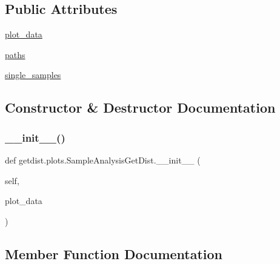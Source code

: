 \subsection*{Public Attributes}
\begin{DoxyCompactItemize}
\item 
\mbox{\hyperlink{classgetdist_1_1plots_1_1SampleAnalysisGetDist_a3ab4d1fcd749ff45996919a28ff26929}{plot\+\_\+data}}
\item 
\mbox{\hyperlink{classgetdist_1_1plots_1_1SampleAnalysisGetDist_a7b6afff3ebf48a36e5488c3ae1a3ebfd}{paths}}
\item 
\mbox{\hyperlink{classgetdist_1_1plots_1_1SampleAnalysisGetDist_ab0d2e2e44789d9e1916aab1b18590c96}{single\+\_\+samples}}
\end{DoxyCompactItemize}


\subsection{Constructor \& Destructor Documentation}
\mbox{\label{classgetdist_1_1plots_1_1SampleAnalysisGetDist_a9cc760a75796bb3250ee75c4d5d3cfd2}} 
\subsubsection{\texorpdfstring{\+\_\+\+\_\+init\+\_\+\+\_\+()}{\_\_init\_\_()}}
{\footnotesize\ttfamily def getdist.\+plots.\+Sample\+Analysis\+Get\+Dist.\+\_\+\+\_\+init\+\_\+\+\_\+ (\begin{DoxyParamCaption}\item[{}]{self,  }\item[{}]{plot\+\_\+data }\end{DoxyParamCaption})}



\subsection{Member Function Documentation}
\mbox{\label{classgetdist_1_1plots_1_1SampleAnalysisGetDist_a34f3bd56dc36332ccb2b2274a628143a}} 
